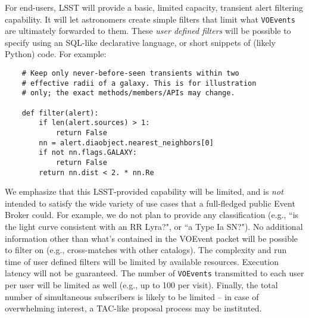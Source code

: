 \documentclass[12pt]{article}
\newcommand{\code}[1]{\texttt{#1}}
\newcommand{\VOEvents}{\code{VOEvents}\xspace}
\begin{document}
For end-users, LSST will provide a basic, limited capacity, transient alert filtering capability. It will let astronomers create simple filters that limit what \VOEvents are ultimately forwarded to them. These {\em user defined filters} will be possible to specify using an SQL-like declarative language, or short snippets of (likely Python) code. For example:
\begin{verbatim}
    # Keep only never-before-seen transients within two
    # effective radii of a galaxy. This is for illustration 
    # only; the exact methods/members/APIs may change.
    
    def filter(alert):
        if len(alert.sources) > 1:
            return False
        nn = alert.diaobject.nearest_neighbors[0]
        if not nn.flags.GALAXY:
            return False
        return nn.dist < 2. * nn.Re
\end{verbatim}

We emphasize that this LSST-provided capability will be limited, and is {\em not} intended to satisfy the wide variety of use cases that a full-fledged public Event Broker could. For example, we do not plan to provide any classification (e.g., ``is the light curve consistent with an RR Lyra?", or ``a Type Ia SN?"). No additional information other than what's contained in the VOEvent packet will be possible to filter on (e.g., cross-matches with other catalogs). The complexity and run time of user defined filters will be limited by available resources. Execution latency will not be guaranteed. The number of \VOEvents transmitted to each user per user will be limited as well (e.g., up to 100 per visit). Finally, the total number of simultaneous subscribers is likely to be limited -- in case of overwhelming interest, a TAC-like proposal process may be instituted.
\end{document}
